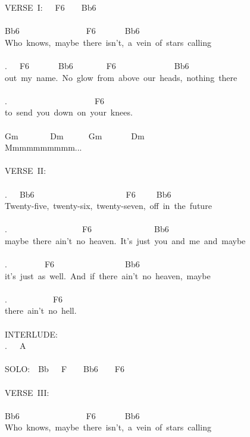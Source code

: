 {VERSE\ I:\ \ \ F6\ \ \ \ Bb6\\
\\
Bb6\ \ \ \ \ \ \ \ \ \ \ \ \ \ \ \ F6\ \ \ \ \ \ \ Bb6\\
Who\ knows,\ maybe\ there\ isn't,\ a\ vein\ of\ stars\ calling\\
\\
.\ \ \ F6\ \ \ \ \ \ \ Bb6\ \ \ \ \ \ \ \ F6\ \ \ \ \ \ \ \ \ \ \ \ \ \ Bb6\\
out\ my\ name.\ No\ glow\ from\ above\ our\ heads,\ nothing\ there\\
\\
.\ \ \ \ \ \ \ \ \ \ \ \ \ \ \ \ \ \ \ \ \ F6\\
to\ send\ you\ down\ on\ your\ knees.\\
\\
Gm \ \ \ \ \ \ \ Dm\ \ \ \ \ \ Gm\ \ \ \ \ \ \ Dm\\
Mmmmmmmmmm...\\
\\
VERSE\ II:\\
\\
.\ \ \ Bb6\ \ \ \ \ \ \ \ \ \ \ \ \ \ \ \ \ \ \ \ \ \ F6\ \ \ \ \ Bb6\\
Twenty-five,\ twenty-six,\ twenty-seven,\ off\ in\ the\ future\\
\\
.\ \ \ \ \ \ \ \ \ \ \ \ \ \ \ \ \ \ F6\ \ \ \ \ \ \ \ \ \ \ \ \ \ \ Bb6\\
maybe\ there\ ain't\ no\ heaven.\ It's\ just\ you\ and\ me\ and\ maybe\\
\\
.\ \ \ \ \ \ \ \ \ F6\ \ \ \ \ \ \ \ \ \ \ \ \ \ \ \ \ Bb6\\
it's\ just\ as\ well.\ And\ if\ there\ ain't\ no\ heaven,\ maybe\\
\\
.\ \ \ \ \ \ \ \ \ \ \ F6\\
there\ ain't\ no\ hell.\\
\\
INTERLUDE:\\
.\ \ \ A\\
\\
SOLO:\ \ Bb\ \ \ F\ \ \ \ Bb6\ \ \ \ F6\\
\\
VERSE\ III:\\
\\
Bb6\ \ \ \ \ \ \ \ \ \ \ \ \ \ \ \ F6\ \ \ \ \ \ \ Bb6\\
Who\ knows,\ maybe\ there\ isn't,\ a\ vein\ of\ stars\ calling\\
}
